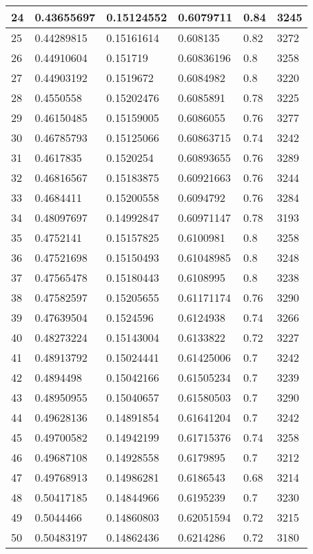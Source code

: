 \begin{longtable}{|l|l|l|l|l|l|}
24 & 0.43655697 & 0.15124552 & 0.6079711 & 0.84 & 3245 \\ \hline 
25 & 0.44289815 & 0.15161614 & 0.608135 & 0.82 & 3272 \\ \hline 
26 & 0.44910604 & 0.151719 & 0.60836196 & 0.8 & 3258 \\ \hline 
27 & 0.44903192 & 0.1519672 & 0.6084982 & 0.8 & 3220 \\ \hline 
28 & 0.4550558 & 0.15202476 & 0.6085891 & 0.78 & 3225 \\ \hline 
29 & 0.46150485 & 0.15159005 & 0.6086055 & 0.76 & 3277 \\ \hline 
30 & 0.46785793 & 0.15125066 & 0.60863715 & 0.74 & 3242 \\ \hline 
31 & 0.4617835 & 0.1520254 & 0.60893655 & 0.76 & 3289 \\ \hline 
32 & 0.46816567 & 0.15183875 & 0.60921663 & 0.76 & 3244 \\ \hline 
33 & 0.4684411 & 0.15200558 & 0.6094792 & 0.76 & 3284 \\ \hline 
34 & 0.48097697 & 0.14992847 & 0.60971147 & 0.78 & 3193 \\ \hline 
35 & 0.4752141 & 0.15157825 & 0.6100981 & 0.8 & 3258 \\ \hline 
36 & 0.47521698 & 0.15150493 & 0.61048985 & 0.8 & 3248 \\ \hline 
37 & 0.47565478 & 0.15180443 & 0.6108995 & 0.8 & 3238 \\ \hline 
38 & 0.47582597 & 0.15205655 & 0.61171174 & 0.76 & 3290 \\ \hline 
39 & 0.47639504 & 0.1524596 & 0.6124938 & 0.74 & 3266 \\ \hline 
40 & 0.48273224 & 0.15143004 & 0.6133822 & 0.72 & 3227 \\ \hline 
41 & 0.48913792 & 0.15024441 & 0.61425006 & 0.7 & 3242 \\ \hline 
42 & 0.4894498 & 0.15042166 & 0.61505234 & 0.7 & 3239 \\ \hline 
43 & 0.48950955 & 0.15040657 & 0.61580503 & 0.7 & 3290 \\ \hline 
44 & 0.49628136 & 0.14891854 & 0.61641204 & 0.7 & 3242 \\ \hline 
45 & 0.49700582 & 0.14942199 & 0.61715376 & 0.74 & 3258 \\ \hline 
46 & 0.49687108 & 0.14928558 & 0.6179895 & 0.7 & 3212 \\ \hline 
47 & 0.49768913 & 0.14986281 & 0.6186543 & 0.68 & 3214 \\ \hline 
48 & 0.50417185 & 0.14844966 & 0.6195239 & 0.7 & 3230 \\ \hline 
49 & 0.5044466 & 0.14860803 & 0.62051594 & 0.72 & 3215 \\ \hline 
50 & 0.50483197 & 0.14862436 & 0.6214286 & 0.72 & 3180 \\ \hline 
\end{longtable}